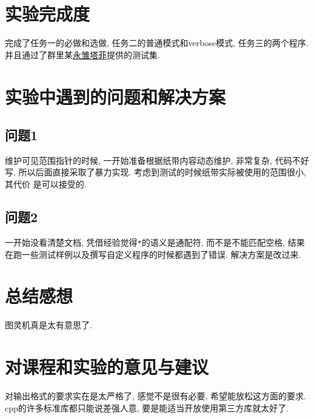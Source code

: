 \documentclass[utf8]{article}
\begin{document}
\section{实验完成度}
完成了任务一的必做和选做, 任务二的普通模式和verbose模式, 任务三的两个程序. 并且通过了群里某\hyperlink{https://www.baidu.com}{永雏塔菲}提供的测试集. 
\section{实验中遇到的问题和解决方案}
\subsection{问题1}
维护可见范围指针的时候, 一开始准备根据纸带内容动态维护, 非常复杂, 代码不好写, 所以后面直接采取了暴力实现. 考虑到测试的时候纸带实际被使用的范围很小, 其代价
是可以接受的. 
\subsection{问题2}
一开始没看清楚文档, 凭借经验觉得\verb|*|的语义是通配符, 而不是不能匹配空格, 结果在跑一些测试样例以及撰写自定义程序的时候都遇到了错误. 解决方案是改过来.
\section{总结感想}
图灵机真是太有意思了. 
\section{对课程和实验的意见与建议}
对输出格式的要求实在是太严格了, 感觉不是很有必要, 希望能放松这方面的要求. cpp的许多标准库都只能说差强人意, 要是能适当开放使用第三方库就太好了. 
\end{document}
